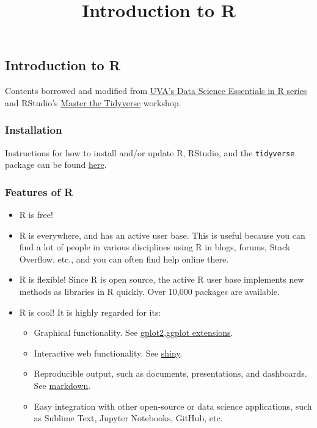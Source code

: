 \documentclass[]{article}
\title{Introduction to R}
\author{}
\date{}
\providecommand{\tightlist}{%
  \setlength{\itemsep}{0pt}\setlength{\parskip}{0pt}}
\begin{document}
\maketitle

\hypertarget{introduction-to-r}{%
\subsection{Introduction to R}\label{introduction-to-r}}

Contents borrowed and modified from
\href{https://uvastatlab.github.io/phdplus/intror.html}{UVA's Data
Science Essentials in R series} and RStudio's
\href{https://github.com/rstudio-education/master-the-tidyverse/blob/master/slides/00-Introduction.pdf}{Master
the Tidyverse} workshop.

\hypertarget{installation}{%
\subsubsection{Installation}\label{installation}}

Instructions for how to install and/or update R, RStudio, and the
\texttt{tidyverse} package can be found
\href{preworkshop_instructions.html}{here}.

\hypertarget{features-of-r}{%
\subsubsection{Features of R}\label{features-of-r}}

\begin{itemize}
\tightlist
\item
  R is free!
\item
  R is everywhere, and has an active user base. This is useful because
  you can find a lot of people in various disciplines using R in blogs,
  forums, Stack Overflow, etc., and you can often find help online
  there.
\item
  R is flexible! Since R is open source, the active R user base
  implements new methods as libraries in R quickly. Over 10,000 packages
  are available.
\item
  R is cool! It is highly regarded for its:

  \begin{itemize}
  \tightlist
  \item
    Graphical functionality. See
    \href{https://ggplot2.tidyverse.org/}{gplot2},\href{http://www.ggplot2-exts.org/gallery/}{ggplot
    extensions}.
  \item
    Interactive web functionality. See
    \href{https://shiny.rstudio.com/gallery/}{shiny}.
  \item
    Reproducible output, such as documents, presentations, and
    dashboards. See
    \href{https://rmarkdown.rstudio.com/gallery.html}{markdown}.
  \item
    Easy integration with other open-source or data science
    applications, such as Sublime Text, Jupyter Notebooks, GitHub, etc.
  \end{itemize}
\end{itemize}
\end{document}
